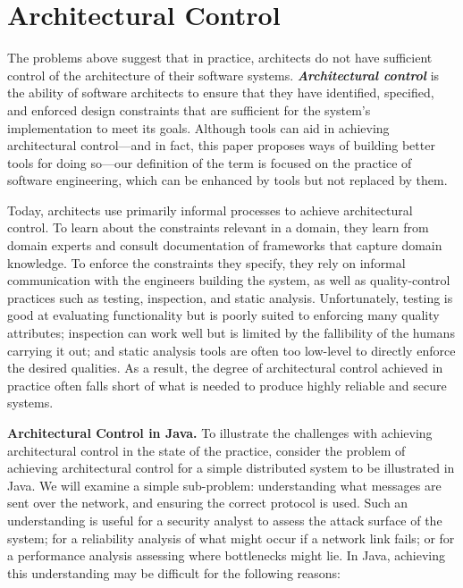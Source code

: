 \documentclass[runningheads]{llncs}
\newcommand{\minisec}[1]{\vspace{2ex}\noindent\textbf{#1}}
\begin{document}
\begin{sloppypar}
\section{Architectural Control}

The problems above suggest that in practice, architects do not have sufficient control of the architecture of their software systems.  \emph{\textbf{Architectural control}} is the ability of software architects to ensure that they have identified, specified, and enforced design constraints that are sufficient for the system's implementation to meet its goals.  Although tools can aid in achieving architectural control---and in fact, this paper proposes ways of building better tools for doing so---our definition of the term is focused on the practice of software engineering, which can be enhanced by tools but not replaced by them.

Today, architects use primarily informal processes to achieve architectural control.  To learn about the constraints relevant in a domain, they learn from domain experts and consult documentation of frameworks that capture domain knowledge.  To enforce the constraints they specify, they rely on informal communication with the engineers building the system, as well as quality-control practices such as testing, inspection, and static analysis.  Unfortunately, testing is good at evaluating functionality but is poorly suited to enforcing many quality attributes; inspection can work well but is limited by the fallibility of the humans carrying it out; and static analysis tools are often too low-level to directly enforce the desired qualities.  As a result, the degree of architectural control achieved in practice often falls short of what is needed to produce highly reliable and secure systems.


\minisec{Architectural Control in Java.}  To illustrate the challenges with achieving architectural control in the state of the practice, consider the problem of achieving architectural control for a simple distributed system to be illustrated in Java.  We will examine a simple sub-problem: understanding what messages are sent over the network, and ensuring the correct protocol is used.  Such an understanding is useful for a security analyst to assess the attack surface of the system; for a reliability analysis of what might occur if a network link fails; or for a performance analysis assessing where bottlenecks might lie.  In Java, achieving this understanding may be difficult for the following reasons:


\end{sloppypar}
\end{document}
